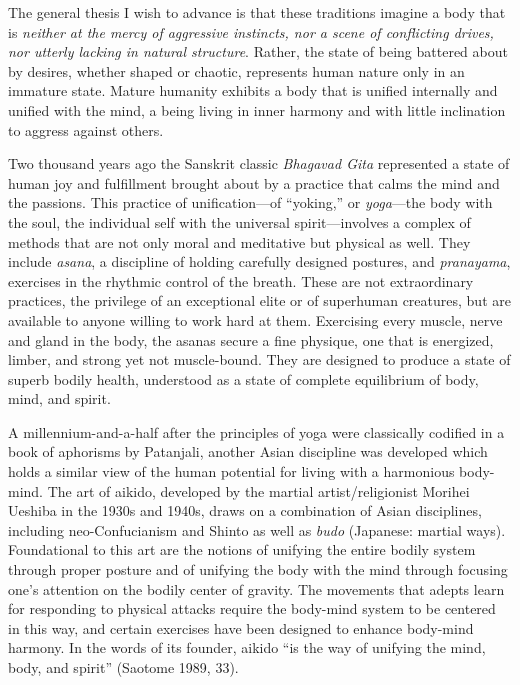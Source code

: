 The general thesis I wish to advance is that these traditions imagine a body that is \emph{neither at the mercy of aggressive instincts, nor a scene of conflicting drives, nor utterly lacking in natural structure}. Rather, the state of being battered about by desires, whether shaped or chaotic, represents human nature only in an immature state. Mature humanity exhibits a body that is unified internally and unified with the mind, a being living in inner harmony and with little inclination to aggress against others. 

Two thousand years ago the Sanskrit classic \emph{Bhagavad Gita} represented a state of human joy and fulfillment brought about by a practice that calms the mind and the passions. This practice of unification---of ``yoking,'' or \emph{yoga}---the body with the soul, the individual self with the universal spirit---involves a complex of methods that are not only moral and meditative but physical as well. They include \emph{asana}, a discipline of holding carefully designed postures, and \emph{pranayama}, exercises in the rhythmic control of the breath. These are not extraordinary practices, the privilege of an exceptional elite or of superhuman creatures, but are available to anyone willing to work hard at them. Exercising every muscle, nerve and gland in the body, the asanas secure a fine physique, one that is energized, limber, and strong yet not muscle-bound. They are designed to produce a state of superb bodily health, understood as a state of complete equilibrium of body, mind, and spirit. 

A millennium-and-a-half after the principles of yoga were classically codified in a book of aphorisms by Patanjali, another Asian discipline was developed which holds a similar view of the human potential for living with a harmonious body-mind. The art of aikido, developed by the martial artist/religionist Morihei Ueshiba in the 1930s and 1940s, draws on a combination of Asian disciplines, including neo-Confucianism and Shinto as well as \emph{budo} (Japanese: martial ways). Foundational to this art are the notions of unifying the entire bodily system through proper posture and of unifying the body with the mind through focusing one's attention on the bodily center of gravity. The movements that adepts learn for responding to physical attacks require the body-mind system to be centered in this way, and certain exercises have been designed to enhance body-mind harmony. In the words of its founder, aikido ``is the way of unifying the mind, body, and spirit'' (Saotome 1989, 33).

